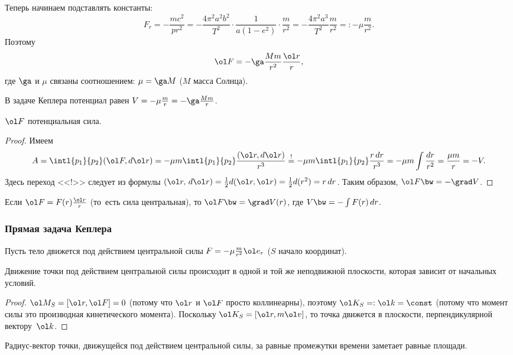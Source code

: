 \documentclass[a4paper,12pt]{article}
\def\F{\ol F}
\def\r{\ol r}
\def\v{\ol v}
\def\e{\ol e}
\def\M{\ol M}
\begin{document}
Теперь начинаем подставлять константы:
$$F_r=-\frac{mc^2}{pr^2}=-\frac{4\pi^2a^2b^2}{T^2}\cdot \frac1{a(1-e^2)}\cdot \frac{m}{r^2}=
-\frac{4\pi^2a^3}{T^2}\frac{m}{r^2}=:-\mu\frac m{r^2}.$$
Поэтому $$\ol F=-\ga\frac{Mm}{r^2}\frac{\r}{r},$$ где
$\ga$ и $\mu$ связаны соотношением: $\mu=\ga M$ ($M$ масса
Солнца).

В задаче Кеплера потенциал равен $V=-\mu\frac{m}{r}=-\ga\frac{Mm}{r}$.

\begin{stm}
$\F$ потенциальная сила.
\end{stm}
\begin{proof}
Имеем
$$
A=\intl{p_1}{p_2}(\F,d\r)=-\mu m \intl{p_1}{p_2}\frac{(\r,d\r)}{r^3}\stackrel{!}{=}
-\mu m\intl{p_1}{p_2}\frac{r\,dr}{r^3}=
-\mu m\int\frac{dr}{r^2}=\frac{\mu m}{r}=-V.
$$
Здесь переход <<!>> следует из формулы $(\r,\,d\r)=\frac12d(\r,\r)=\frac12d(r^2)=r\,dr$.
Таким образом, $\F\bw=-\grad V$.
\end{proof}

\begin{note}
Если $\ol F=F(r)\frac{\r}r$ (то~есть сила центральная), то $\ol F\bw=\grad V(r)$,
где $V\bw=-\int F(r)\,dr$.
\end{note}

\subsubsection{Прямая задача Кеплера}

Пусть тело движется под действием центральной
силы $F=-\mu\frac{m}{r^2}\e_r$ ($S$ начало координат).

\begin{stm}
Движение точки под действием центральной силы
происходит в одной и той же неподвижной плоскости, которая зависит
от начальных условий.
\end{stm}

\begin{proof}
$\M_S=[\r,\F]= 0$ (потому что $\r$ и $\F$ просто коллинеарны), поэтому $\ol K_S=:\ol k=\const$
(потому что момент силы это производная кинетического момента).
Поскольку $\ol K_S=[\r,m\v]$, то точка движется в плоскости, перпендикулярной вектору~$\ol k$.
\end{proof}

\begin{stm}
Радиус-вектор точки, движущейся под действием
центральной силы, за равные промежутки времени заметает равные площади.
\end{stm}
\end{document}
